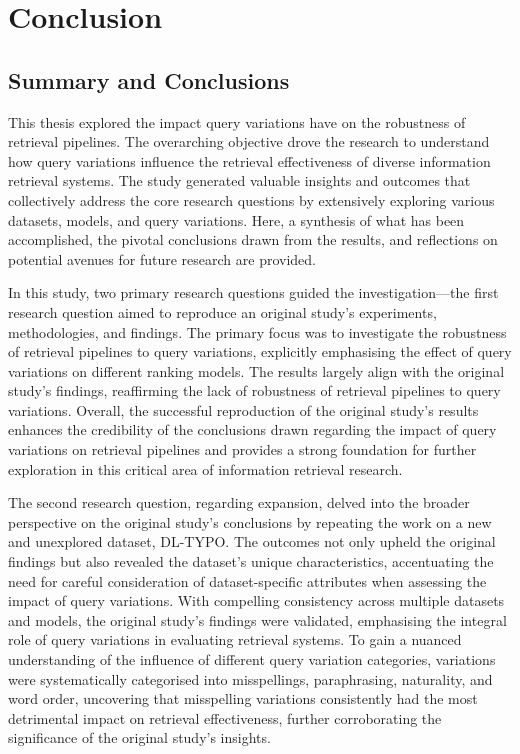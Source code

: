 \chapter{Conclusion}
\section{Summary and Conclusions}
This thesis explored the impact query variations have on the robustness of retrieval pipelines. The overarching objective drove the research to understand how query variations influence the retrieval effectiveness of diverse information retrieval systems. The study generated valuable insights and outcomes that collectively address the core research questions by extensively exploring various datasets, models, and query variations. Here, a synthesis of what has been accomplished, the pivotal conclusions drawn from the results, and reflections on potential avenues for future research are provided.

In this study, two primary research questions guided the investigation—the first research question aimed to reproduce an original study's experiments, methodologies, and findings. The primary focus was to investigate the robustness of retrieval pipelines to query variations, explicitly emphasising the effect of query variations on different ranking models. The results largely align with the original study's findings, reaffirming the lack of robustness of retrieval pipelines to query variations. Overall, the successful reproduction of the original study's results enhances the credibility of the conclusions drawn regarding the impact of query variations on retrieval pipelines and provides a strong foundation for further exploration in this critical area of information retrieval research.

The second research question, regarding expansion, delved into the broader perspective on the original study's conclusions by repeating the work on a new and unexplored dataset, DL-TYPO. The outcomes not only upheld the original findings but also revealed the dataset's unique characteristics, accentuating the need for careful consideration of dataset-specific attributes when assessing the impact of query variations. With compelling consistency across multiple datasets and models, the original study's findings were validated, emphasising the integral role of query variations in evaluating retrieval systems. To gain a nuanced understanding of the influence of different query variation categories, variations were systematically categorised into misspellings, paraphrasing, naturality, and word order, uncovering that misspelling variations consistently had the most detrimental impact on retrieval effectiveness, further corroborating the significance of the original study's insights.

